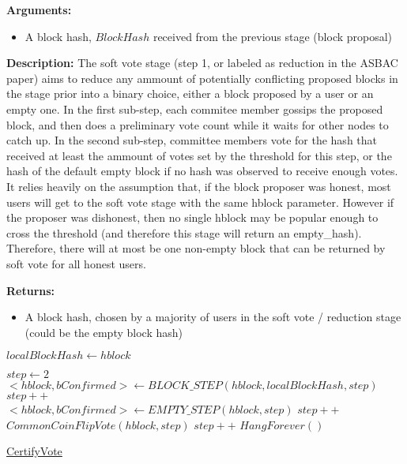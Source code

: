 \documentclass[10pt,a4paper]{article}
\begin{document}
\textbf{Arguments:}
\begin{itemize}
    \item A block hash, $BlockHash$ received from the previous stage (block proposal)
  \end{itemize}

\textbf{Description:}
The soft vote stage (step 1, or labeled as reduction in the ASBAC paper) aims to reduce any ammount of potentially conflicting proposed blocks in the stage prior into a binary choice, either a block proposed by a user or an empty one.
In the first sub-step, each commitee member gossips the proposed block, and then does a preliminary vote count while it waits for other nodes to catch up.
In the second sub-step, committee members vote for the hash that received at least the ammount of votes set by the threshold for this step, or the hash of the default empty block if no hash was observed to receive enough votes.
It relies heavily on the assumption that, if the block proposer was honest, most users will get to the soft vote stage with the same hblock parameter.
However if the proposer was dishonest, then no single hblock may be popular enough to cross the threshold (and therefore this stage will return an empty\_hash).
Therefore, there will at most be one non-empty block that can be returned by soft vote for all honest users.

\textbf{Returns:}
\begin{itemize}
    \item A block hash, chosen by a majority of users in the soft vote / reduction stage 
    (could be the empty block hash)
  \end{itemize}

\begin{algorithm}
    \begin{algorithmic}[H]
    \State $localBlockHash \gets hblock$

    \State $step \gets 2$
        \\
        \State $<hblock, bConfirmed> \gets BLOCK\_STEP(hblock, localBlockHash, step)$
        \EndIf
        \State $step++$\\
   
        \State $<hblock, bConfirmed> \gets EMPTY\_STEP(hblock,step)$
        \EndIf
        \State $step++$\\

        \State $CommonCoinFlipVote(hblock, step)$
        \State $step++$
    \EndWhile
    \State $HangForever()$
    \EndFunction
    \end{algorithmic}
    \caption{\underline{CertifyVote}}
\end{algorithm}
\end{document}

